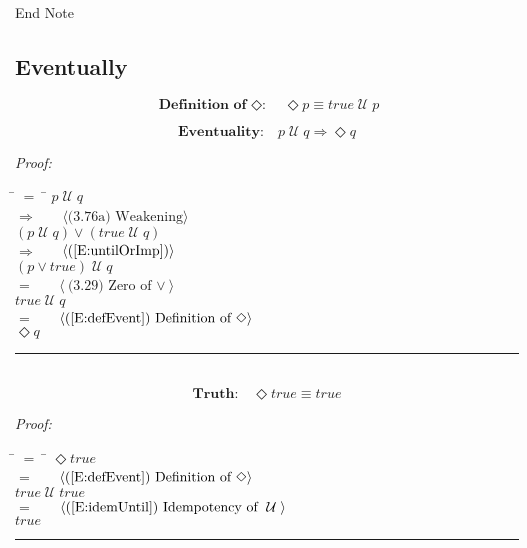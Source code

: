 \documentclass[fleqn, leqno]{article}
\newcommand{\lgap}{2pt}                             %
\newcommand{\mymathindent}{24pt}                    %
\newcommand{\Until}{\;\mathcal{U}\;}
\newcommand{\Event}{\Diamond}
\newcommand{\myqed}{\hfill\rule[-.23ex]{1.2ex}{2.0ex}}
\newcommand{\Gll} {\langle}                         %
\newcommand{\Ggg} {\rangle}                         %
\newcommand{\Hint}[1]     {\ \ \ $\Gll              \mbox{#1} \Ggg$ }   %
\begin{document}
End Note\\

\subsection{Eventually}

\begin{equation}\label{E:defEvent}
\textbf{Definition of $\Event$:}\quad \Event p \equiv true \Until p
\end{equation}

\begin{equation}\label{E:eventuality}
\textbf{Eventuality:}\quad p \Until q \Rightarrow \Event q
\end{equation}

\emph{Proof:}
\begin{tabbing}
\hspace{\mymathindent} \= $= \;$ \= \kill
  \> \>   $p \Until q$\\[\lgap]
  \> $\Rightarrow$  \>  \Hint{(3.76a) Weakening}\\[\lgap]
  \> \>   $(p \Until q) \lor (true \Until q)$\\[\lgap]
  \> $\Rightarrow$  \>  \Hint{(\ref{E:untilOrImp})}\\[\lgap]
  \> \>   $(p \lor true) \Until q$\\[\lgap]
  \> $=$  \>  \Hint{(3.29) Zero of $\lor$}\\[\lgap]
  \> \>   $true \Until q$\\[\lgap]
  \> $=$  \>  \Hint{(\ref{E:defEvent}) Definition of $\Event$}\\[\lgap]
  \> \>   $\Event q$\\[\lgap]
\end{tabbing}
\myqed\\[\lgap]


\begin{equation}\label{E:eventTrue}
\textbf{Truth:}\quad \Event true \equiv true
\end{equation}

\emph{Proof:}
\begin{tabbing}
\hspace{\mymathindent} \= $= \;$ \= \kill
  \> \>   $\Event true$\\[\lgap]
  \> $=$  \>  \Hint{(\ref{E:defEvent}) Definition of $\Event$}\\[\lgap]
  \> \>   $true \Until true$\\[\lgap]
  \> $=$  \>  \Hint{(\ref{E:idemUntil}) Idempotency of $\Until$}\\[\lgap]
  \> \>   $true$\\[\lgap]
\end{tabbing}
\myqed\\[\lgap]
\end{document}
